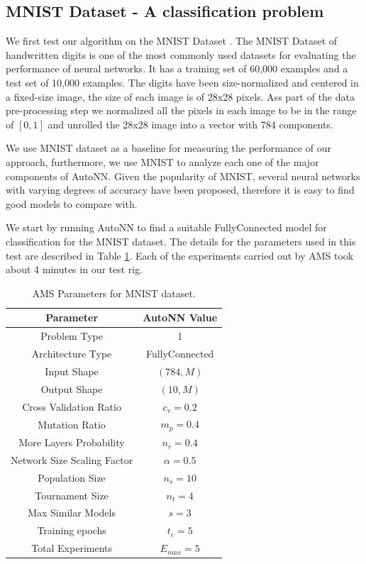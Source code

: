 \documentclass[journal]{IEEEtran}
\begin{document}
\subsection{MNIST Dataset - A classification problem}

We first test our algorithm on the MNIST Dataset \cite{Lecun2010}. The MNIST Dataset of handwritten digits is one of the most commonly used datasets for evaluating the performance of neural networks. It has a training set of 60,000 examples and a test set of 10,000 examples. The digits have been size-normalized and centered in a fixed-size image, the size of each image is of 28x28 pixels. Ass part of the data pre-processing step we normalized all the pixels in each image to be in the range of $[0,1]$ and unrolled the 28x28 image into a vector with 784 components.

We use MNIST dataset as a baseline for measuring the performance of our approach, furthermore, we use MNIST to analyze each one of the major components of AutoNN. Given the popularity of MNIST, several neural networks with varying degrees of accuracy have been proposed, therefore it is easy to find good models to compare with. 

We start by running AutoNN to find a suitable FullyConnected model for classification for the MNIST dataset. The details for the parameters used in this test are described in Table \ref{table:MNIST_params}. Each of the experiments carried out by AMS took about 4 minutes in our test rig.

\begin{table}[!htb]
\begin{center}
\begin{tabular}{| c | c |}
\hline
Parameter & AutoNN Value \\
\hline
Problem Type & 1 \\
Architecture Type & FullyConnected \\
Input Shape & $(784, M)$  \\
Output Shape & $(10, M)$ \\
Cross Validation Ratio & $c_v = 0.2$ \\
Mutation Ratio & $m_p = 0.4$ \\
More Layers Probability & $n_r = 0.4$ \\
Network Size Scaling Factor & $\alpha = 0.5$ \\
Population Size & $n_s = 10$ \\
Tournament Size & $n_t = 4$ \\
Max Similar Models & $s = 3$ \\
Training epochs & $t_e = 5$\\
Total Experiments & $E_{max} = 5$ \\
\hline
\end{tabular}
\end{center}
\caption{AMS Parameters for MNIST dataset.}
\label{table:MNIST_params}
\end{table}
\end{document}
